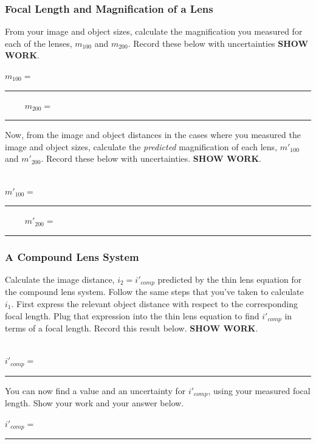\subsubsection{Focal Length and Magnification of a Lens}
\noindent
From your image and object sizes, calculate the magnification you measured for
each of the lenses, $m_{100}$ and $m_{200}.$ Record these below with
uncertainties {\bf SHOW WORK}. \\
\vspace*{3cm} 
\begin{center}
$m_{100}=$~\rule{3cm}{.1mm} ~~~~
$m_{200}=$~\rule{3cm}{.1mm}
\end{center}
\vspace*{.5cm}
\noindent 
Now, from the image and object distances in the cases where you measured the
image and object sizes, calculate the {\it predicted} magnification of each lens,
$m'_{100}$ and $m'_{200}.$ Record these below with uncertainties. {\bf SHOW WORK}. \\
\vspace*{3cm} \\
\begin{center}
$m'_{100}=$~\rule{3cm}{.1mm} ~~~~
$m'_{200}=$~\rule{3cm}{.1mm}
\end{center}

\subsubsection{A Compound Lens System}
Calculate the image distance, $i_2=i'_{comp}$ predicted by the thin lens
equation for the compound lens system. Follow the same steps that you've taken
to calculate $i_1$. First express the relevant object distance with respect
to the corresponding focal length. Plug that expression into the thin lens
equation to find $i'_{comp}$ in terms of a focal length. Record this result
below. {\bf SHOW WORK}. \\
\vspace*{2cm} \\
\begin{center}
$i'_{comp}=$~\rule{3cm}{.1mm}
\end{center}
\noindent You can now find a value and an uncertainty for $i'_{comp}$, using
your measured focal length. Show your work and your answer below.
\vspace*{2cm} \\
\begin{center}
$i'_{comp}=$~\rule{3cm}{.1mm}
\end{center}
\vspace*{.5cm}

